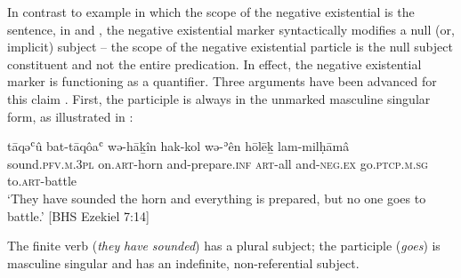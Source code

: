 \documentclass[output=paper,colorlinks,citecolor=brown,draft,draftmode]{langscibook}
\begin{document}
In contrast to example  in which the scope of the
negative existential is the sentence, in  and
, the negative existential marker syntactically modifies a
null (or, implicit) subject -- the scope of the negative existential
particle is the null subject constituent and not the entire predication. In
effect, the negative existential marker is functioning as a quantifier.
Three arguments have been advanced for this claim \parencites(see)()%
{MillerNaude2015}{NaudeMiller2016a}.
First, the participle is always in the unmarked masculine singular form, as
illustrated in :
%
\begin{exe}\ex \label{ex:heb-battle}
    \gll tāqǝʿû bat-tāqôaʿ wǝ-hāḵîn hak-kol  wǝ-ʾên hōlēḵ lam-milḥāmâ \\
sound.\textsc{pfv.m.3pl} on.\textsc{art}-horn   and-prepare.\textsc{inf}
\textsc{art}-all  and-\textsc{neg.ex}   go.\textsc{ptcp.m.sg}
to.\textsc{art}-battle \\
    \glt `They have sounded the horn and everything is prepared, but no one
    goes to battle.' [BHS Ezekiel 7:14]
    \end{exe}
%
The finite verb (\textit{they} \textit{have} \textit{sounded}) has a plural subject; the participle (\textit{goes}) is masculine singular and has an indefinite, non-referential subject.
\end{document}
